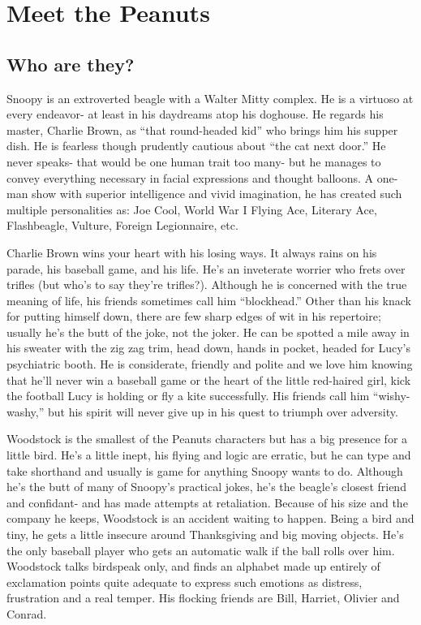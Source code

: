 \chapter{Meet the Peanuts}\label{FAQ}



\section{Who are they?}

Snoopy is an extroverted beagle with a Walter Mitty complex. He is a virtuoso at every endeavor- at least in his daydreams atop his doghouse. He regards his master, Charlie Brown, as ``that round-headed kid'' who brings him his supper dish. He is fearless though prudently cautious about ``the cat next door.'' He never speaks- that would be one human trait too many- but he manages to convey everything necessary in facial expressions and thought balloons. A one-man show with superior intelligence and vivid imagination, he has created such multiple personalities as: Joe Cool, World War I Flying Ace, Literary Ace, Flashbeagle, Vulture, Foreign Legionnaire, etc.


Charlie Brown wins your heart with his losing ways. It always rains on his parade, his baseball game, and his life. He's an inveterate worrier who frets over trifles (but who's to say they're trifles?). Although he is concerned with the true meaning of life, his friends sometimes call him ``blockhead.'' Other than his knack for putting himself down, there are few sharp edges of wit in his repertoire; usually he's the butt of the joke, not the joker. He can be spotted a mile away in his sweater with the zig zag trim, head down, hands in pocket, headed for Lucy's psychiatric booth. He is considerate, friendly and polite and we love him knowing that he'll never win a baseball game or the heart of the little red-haired girl, kick the football Lucy is holding or fly a kite successfully. His friends call him ``wishy-washy,'' but his spirit will never give up in his quest to triumph over adversity.

Woodstock is the smallest of the Peanuts characters but has a big presence for a little bird. He's a little inept, his flying and logic are erratic, but he can type and take shorthand and usually is game for anything Snoopy wants to do. Although he's the butt of many of Snoopy's practical jokes, he's the beagle's closest friend and confidant- and has made attempts at retaliation. Because of his size and the company he keeps, Woodstock is an accident waiting to happen. Being a bird and tiny, he gets a little insecure around Thanksgiving and big moving objects. He's the only baseball player who gets an automatic walk if the ball rolls over him. Woodstock talks birdspeak only, and finds an alphabet made up entirely of exclamation points quite adequate to express such emotions as distress, frustration and a real temper. His flocking friends are Bill, Harriet, Olivier and Conrad.

